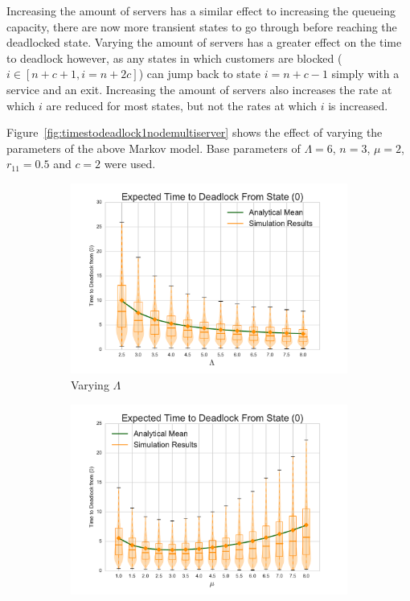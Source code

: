 \documentclass{article}
\begin{document}
Increasing the amount of servers has a similar effect to increasing the queueing capacity, there are now more transient states to go through before reaching the deadlocked state.
Varying the amount of servers has a greater effect on the time to deadlock however, as any states in which customers are blocked ($i \in [n+c+1, i=n+2c]$) can jump back to state $i=n+c-1$ simply with a service and an exit.
Increasing the amount of servers also increases the rate at which $i$ are reduced for most states, but not the rates at which $i$ is increased.

Figure~\ref{fig:timestodeadlock1nodemultiserver} shows the effect of varying the parameters of the above Markov model.
Base parameters of $\Lambda = 6$, $n = 3$, $\mu = 2$, $r_{11} = 0.5$ and $c = 2$ were used.

\begin{figure}[!htbp]
  \begin{center}
  \begin{subfigure}[b]{0.35\textwidth}
    \includegraphics[width=\textwidth]{images/varyL_1Nms}
    \caption{Varying $\Lambda$}
    \label{fig:1Nms_L}
  \end{subfigure}
  \begin{subfigure}[b]{0.35\textwidth}
    \includegraphics[width=\textwidth]{images/varymu_1Nms}

\end{subfigure}
\end{center}
\end{figure}
\end{document}
